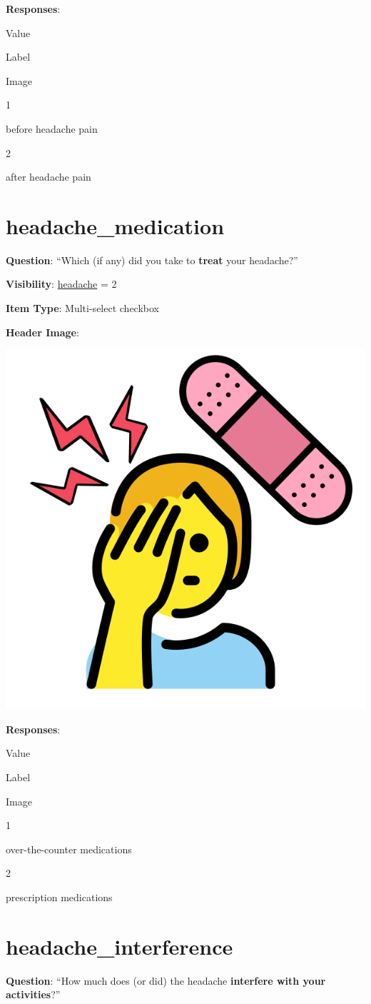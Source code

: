 \documentclass[]{book}
\begin{document}
\textbf{Responses}:

Value

Label

Image

1

before headache pain

2

after headache pain

\hypertarget{headache_medication}{%
\section{headache\_medication}\label{headache_medication}}

\textbf{Question}: ``Which (if any) did you take to \textbf{treat} your headache?''

\textbf{Visibility}: \protect\hyperlink{headache}{headache} = 2

\textbf{Item Type}: Multi-select checkbox

\textbf{Header Image}:

\begin{flushleft}\includegraphics[width=0.33\linewidth]{downloadFigs4latex_NIMH_Applet_Codebook/headache_medication_headerImg} \end{flushleft}

\textbf{Responses}:

Value

Label

Image

1

over-the-counter medications

2

prescription medications

\hypertarget{headache_interference}{%
\section{headache\_interference}\label{headache_interference}}

\textbf{Question}: ``How much does (or did) the headache \textbf{interfere with your activities}?''
\end{document}
